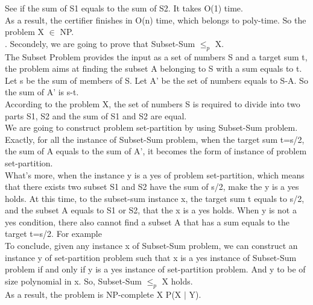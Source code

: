 \documentclass[]{article}
\begin{document}
	See if the sum of S1 equals to the sum of S2. It takes O(1) time.  \\
		
	\noindent As a result, the certifier finishes in O(n) time, which belongs to poly-time. So the problem X $\in$ NP. \\
	
	. Secondely, we are going to prove that Subset-Sum $\leq_{p}$ X.  \\
	
	\noindent The Subset Problem provides the input as a set of numbers S and a target sum t, the problem aims at finding the subset A belonging to S with a sum equals to t. Let s be the sum of members of S. Let A' be the set of numbers equals to S-A. So the sum of A' is s-t.  \\
	
	\noindent According to the problem X, the set of numbers S is required to divide into two parts S1, S2 and the sum of S1 and S2 are equal.   \\
	
	\noindent We are going to construct problem set-partition by using Subset-Sum problem. Exactly, for all the instance of Subset-Sum problem, when the target sum t=s/2, the sum of A equals to the sum of A', it becomes the form of instance of problem set-partition. \\
	
	\noindent What's more, when the instance y is a yes of problem set-partition, which means that there exists two subset S1 and S2 have the sum of s/2, make the y is a yes holds. At this time, to the subset-sum instance x, the target sum t equals to s/2, and the subset A equals to S1 or S2, that the x is a yes holds. When y is not a yes condition, there also cannot find a subset A that has a sum equals to the target t=s/2. For example \\
	
	\noindent To conclude, given any instance x of Subset-Sum problem, we can construct an instance y of set-partition problem such that x is a yes instance of Subset-Sum problem if and only if y is a yes instance of set-partition problem. And y to be of size polynomial in x. So, Subset-Sum $\leq_{p}$ X holds. \\
	
	\noindent As a result, the problem is NP-complete X \backsim P(X $\vert$ Y).  \\

	
\end{document}
